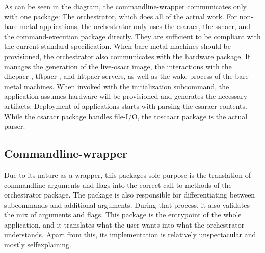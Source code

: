 As can be seen in the diagram, the commandline-wrapper communicates only with one package: The orchestrator, which does all of the actual work. For non-bare-metal applications, the orchestrator only uses the \gls{csaracr}, the \gls{sshacr}, and the command-execution package directly. They are sufficient to be compliant with the current standard specification. When bare-metal machines should be provisioned, the orchestrator also communicates with the hardware package. It manages the generation of the live-\gls{osacr} image, the interactions with the \gls{dhcpacr}-, \gls{tftpacr}-, and \gls{httpacr}-servers, as well as the wake-process of the bare-metal machines.
\newline
When invoked with the initialization subcommand, the application assumes hardware will be provisioned and generates the necessary artifacts.
\newline
Deployment of applications starts with parsing the \gls{csaracr} contents. While the \gls{csaracr} package handles file-I/O, the \gls{toscaacr} package is the actual parser.

\subsection{Commandline-wrapper}
Due to its nature as a wrapper, this packages sole purpose is the translation of commandline arguments and flags into the correct call to methods of the orchestrator package. The package is also responsible for differentiating between subcommands and additional arguments. During that process, it also validates the mix of arguments and flags.
\newline
This package is the entrypoint of the whole application, and it translates what the user wants into what the orchestrator understands. Apart from this, its implementation is relatively unspectacular and mostly selfexplaining.

